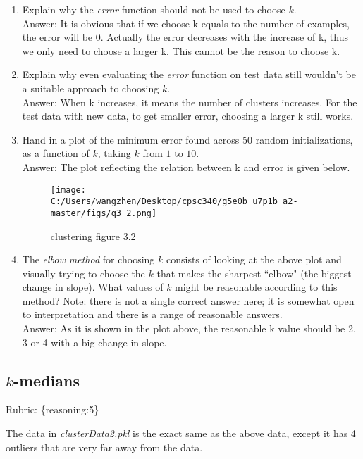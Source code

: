 \documentclass{article}
\def\blu#1{{\color{blu}#1}}
\def\gre#1{{\color{gre}#1}}
\def\enum#1{\begin{enumerate}#1\end{enumerate}}
\def\rubric#1{\gre{Rubric: \{#1\}}}{}
\begin{document}
 \blu{\enum{
 \item Explain why the \emph{error} function should not be used to choose $k$.
 \textcolor{gre}{\\Answer: It is obvious that if we choose k equals to the number of examples, the error will be 0. Actually the error decreases with the increase of k, thus we only need to choose a larger k. This cannot be the reason to choose k.}
 \item Explain why even evaluating the \emph{error} function on test data still wouldn't be a suitable approach to choosing $k$.
 \textcolor{gre}{\\Answer: When k increases, it means the number of clusters increases. For the test data with new data, to get smaller error, choosing a larger k still works.}
 \item Hand in a plot of the minimum error found across 50 random initializations, as a function of $k$, taking $k$ from $1$ to $10$.
 \textcolor{gre}{\\Answer: The plot reflecting the relation between k and error is given below.\\}
  \begin{figure}[h!]
 \texttt{[image: C:/Users/wangzhen/Desktop/cpsc340/g5e0b\_u7p1b\_a2-master/figs/q3\_2.png]}
\caption{clustering figure 3.2}
\end{figure}
 \item The \emph{elbow method} for choosing $k$ consists of looking at the above plot and visually trying to choose the $k$ that makes the sharpest ``elbow" (the biggest change in slope). What values of $k$ might be reasonable according to this method? Note: there is not a single correct answer here; it is somewhat open to interpretation and there is a range of reasonable answers.
 \textcolor{gre}{\\Answer: As it is shown in the plot above, the reasonable k value should be 2, 3 or 4 with a big change in slope. }
 }}

 \subsection{$k$-medians}
\rubric{reasoning:5}

 The data in \emph{clusterData2.pkl} is the exact same as the above data, except it has 4 outliers that are very far away from the data.
\end{document}
